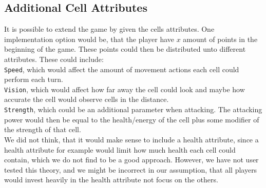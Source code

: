 \subsection{Additional Cell Attributes}
It is possible to extend the game by given the cells attributes.
One implementation option would be, that the player have $x$ amount of points in the beginning of the game.
These points could then be distributed unto different attributes.
These could include:\\

\verb|Speed|, which would affect the amount of movement actions each cell could perform each turn.\\
\verb|Vision|, which would affect how far away the cell could look and maybe how accurate the cell would observe cells in the distance.\\
\verb|Strength|, which could be an additional parameter when attacking. The attacking power would then be equal to the health/energy of the cell plus some modifier of the strength of that cell.\\

We did not think, that it would make sense to include a health attribute, since a health attribute for example would limit how much health each cell could contain, which we do not find to be a good approach.
However, we have not user tested this theory, and we might be incorrect in our assumption, that all players would invest heavily in the health attribute not focus on the others.